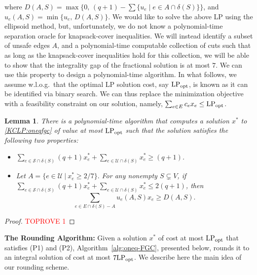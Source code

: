 \documentclass[11pt]{article}
\newtheorem{lemma}[theorem]{Lemma}
\newcommand\lpopt{\hbox{\text{LP}$_{\text{opt}}$}}
\newcommand{\safe}{\mathscr{S}}
\newcommand{\unsafe}{\mathscr{U}}
\newcommand{\oneqfgcapx}{7}
\begin{document}
{where $D(A,S) = \max\{0,\, (q+1)-\sum\{ u_e \mid e\in{A}\cap\delta(S)\}\}$, and $u_e(A,S) = \min\{u_e,\, D(A,S)\}$.
We would like to solve the above LP using the ellipsoid method, but, unfortunately, we do not know a polynomial-time separation oracle for knapsack-cover inequalities. We will instead identify a subset of unsafe edges $A$, and a polynomial-time computable collection of cuts such that as long as the knapsack-cover inequalities hold for this collection, we will be able to show that the integrality gap of the fractional solution is at most $\oneqfgcapx$. We can use this property to design a polynomial-time algorithm. In what follows, we assume w.l.o.g.\ that the optimal LP solution cost, say $\lpopt$, is known as it can be identified via binary search. We can thus replace the minimization objective with a feasibility constraint on our solution, namely, $\sum_{e\in E}c_e x_e \leq \lpopt$.



\begin{lemma}\label{lem:polytimeKC-oneqfgc}
There is a polynomial-time algorithm that computes a solution $x^*$ to \eqref{KCLP:oneqfgc} of value at most $\lpopt$ such that the solution satisfies the following two properties:

\begin{itemize}
\item[(P1)]
$\sum_{e\in\safe\cap\delta(S)} (q+1) x^*_e + \sum_{e\in\unsafe\cap\delta(S)} x^*_e \geq (q+1)$.

\item[(P2)]
Let $A = \{ e \in  \unsafe~|~x^*_e \ge 2/7 \}.$
For any nonempty ${S}\subsetneq{V}$,
if $\sum_{e\in\safe\cap\delta(S)} (q+1) x^*_e +
\sum_{e\in\unsafe\cap\delta(S)} x^*_e \leq 2(q+1)$, then
$$\sum_{e\in E\cap\delta(S) - A} u_e(A,S) x_e \geq D(A,S).$$
\end{itemize}
\end{lemma}
\begin{proof}\textcolor{red}{TOPROVE 1}\end{proof}



\noindent
{\bf The Rounding Algorithm:}
Given a solution $x^*$ of cost at most $\lpopt$ that satisfies (P1) and (P2), Algorithm~\ref{alg:oneq-FGC}, presented below, rounds it to an integral solution of cost at most $7\lpopt$. We describe here the main idea of our rounding scheme. 

}
\end{document}
